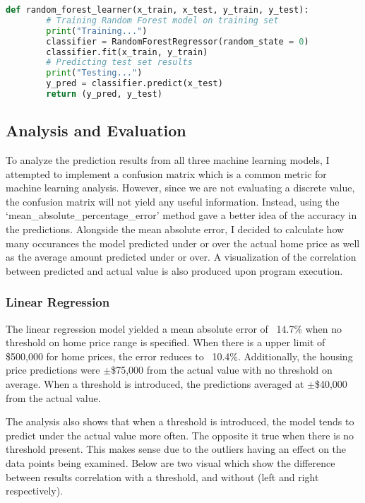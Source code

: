 \documentclass[12pt]{article}
\renewcommand{\baselinestretch}{2}
\begin{document}
        \renewcommand{\baselinestretch}{1.5}
        \begin{lstlisting}[language=Python, caption=Linear regression implementation]
    def random_forest_learner(x_train, x_test, y_train, y_test):
        # Training Random Forest model on training set
        print("Training...")
        classifier = RandomForestRegressor(random_state = 0)
        classifier.fit(x_train, y_train)
        # Predicting test set results
        print("Testing...")
        y_pred = classifier.predict(x_test)
        return (y_pred, y_test)
        \end{lstlisting}
        \renewcommand{\baselinestretch}{2}

    \subsection{Analysis and Evaluation}
    To analyze the prediction results from all three machine learning models, I attempted to implement a confusion 
    matrix which is a common metric for machine learning analysis. However, since we are not evaluating a discrete 
    value, the confusion matrix will not yield any useful information. Instead, using the `mean\_absolute\_percentage\_error'
    method gave a better idea of the accuracy in the predictions. Alongside the mean absolute error, I decided to 
    calculate how many occurances the model predicted under or over the actual home price as well as the average amount 
    predicted under or over. A visualization of the correlation between predicted and actual value is also produced 
    upon program execution.

        \subsubsection{Linear Regression}
        The linear regression model yielded a mean absolute error of ~14.7\% when no threshold on home price range is specified. 
        When there is a upper limit of \$500,000 for home prices, the error reduces to ~10.4\%. Additionally, the housing price 
        predictions were $\pm$\$75,000 from the actual value with no threshold on average. When a threshold is introduced, the predictions 
        averaged at $\pm$\$40,000 from the actual value. 

        The analysis also shows that when a threshold is introduced, the model tends to predict under the actual value more often.
        The opposite it true when there is no threshold present. This makes sense due to the outliers having an effect on the data 
        points being examined. Below are two visual which show the difference between results correlation with a threshold, and without
        (left and right respectively).
\end{document}
